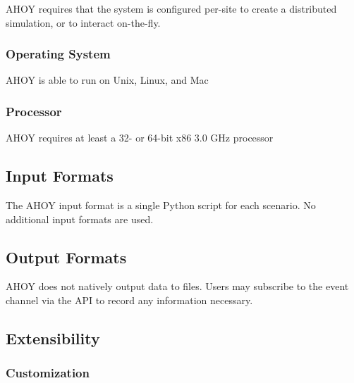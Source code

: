 \documentclass[titlepage]{article}
\newcommand{\cbox}[0]{
    \CheckBox[height=5pt,width=5pt]{}
}
\begin{document}
\begin{Form}
AHOY requires that the system is configured per-site to create a distributed simulation, or to interact on-the-fly.\cbox


\subsubsection{Operating System%
  \label{operating-system}%
}

AHOY is able to run on Unix, Linux, and Mac\cbox


\subsubsection{Processor%
  \label{processor}%
}

AHOY requires at least a 32- or 64-bit x86 3.0 GHz processor\cbox


\subsection{Input Formats%
  \label{input-formats}%
}

The AHOY input format is a single Python script for each scenario.  No additional input formats are used.\cbox


\subsection{Output Formats%
  \label{output-formats}%
}

AHOY does not natively output data to files.  Users may subscribe to the event channel via the API to record any information necessary.\cbox

\subsection{Extensibility%
  \label{extensibility}%
}
\subsubsection{Customization}

\end{Form}
\end{document}
